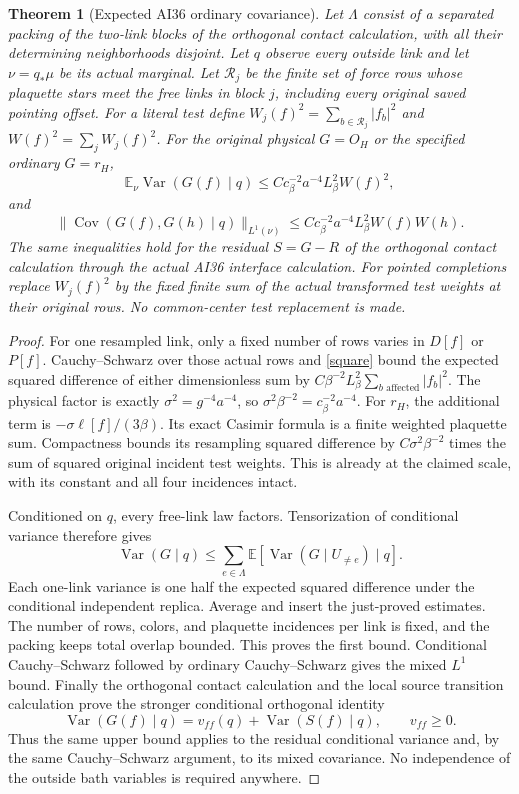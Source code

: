\documentclass[11pt]{article}
\newtheorem{theorem}{Theorem}
\newcommand{\E}{\mathbb E}
\newcommand{\Cov}{\operatorname{Cov}}
\newcommand{\Var}{\operatorname{Var}}
\begin{document}
\begin{theorem}[Expected AI36 ordinary covariance]
Let $\Lambda$ consist of a separated packing of the two-link blocks of the orthogonal contact calculation, with
all their determining neighborhoods disjoint. Let $q$ observe every outside link and let
$\nu=q_*\mu$ be its actual marginal. Let $\mathcal R_j$ be the finite set of force rows
whose plaquette stars meet the free links in block $j$, including every original saved
pointing offset. For a literal test define
$W_j(f)^2=\sum_{b\in\mathcal R_j}|f_b|^2$ and $W(f)^2=\sum_jW_j(f)^2$.
For the original physical $G=O_H$ or the specified ordinary $G=r_H$,
\[
 \E_\nu\Var(G(f)\mid q)\le Cc_\beta^{-2}a^{-4}L_\beta^2 W(f)^2,
\]
and
\[
 \|\Cov(G(f),G(h)\mid q)\|_{L^1(\nu)}
 \le Cc_\beta^{-2}a^{-4}L_\beta^2 W(f)W(h).
\]
The same inequalities hold for the residual $S=G-R$ of the orthogonal contact calculation through the actual AI36 interface calculation.
For pointed completions replace $W_j(f)^2$ by the fixed finite sum of the actual
transformed test weights at their original rows. No common-center test replacement is made.
\end{theorem}
\begin{proof}
For one resampled link, only a fixed number of rows varies in $D[f]$ or $P[f]$.
Cauchy--Schwarz over those actual rows and \eqref{square} bound the expected squared
difference of either dimensionless sum by
$C\beta^{-2}L_\beta^2\sum_{b\text{ affected}}|f_b|^2$.
The physical factor is exactly $\sigma^2=g^{-4}a^{-4}$, so
$\sigma^2\beta^{-2}=c_\beta^{-2}a^{-4}$.
For $r_H$, the additional term is $-\sigma\ell[f]/(3\beta)$.
Its exact Casimir formula is a finite weighted plaquette sum. Compactness bounds its
resampling squared difference by $C\sigma^2\beta^{-2}$ times the sum of squared
original incident test weights. This is already at the claimed scale, with its constant
and all four incidences intact.

Conditioned on $q$, every free-link law factors. Tensorization of conditional variance
therefore gives
\[
 \Var(G\mid q)\le\sum_{e\in\Lambda}\E[\Var(G\mid U_{\ne e})\mid q].
\]
Each one-link variance is one half the expected squared difference under the conditional
independent replica. Average and insert the just-proved estimates. The number of rows,
colors, and plaquette incidences per link is fixed, and the packing keeps total overlap
bounded. This proves the first bound. Conditional Cauchy--Schwarz followed by ordinary
Cauchy--Schwarz gives the mixed $L^1$ bound.
Finally the orthogonal contact calculation and the local source transition calculation prove the stronger conditional orthogonal identity
\[
 \Var(G(f)\mid q)=v_{ff}(q)+\Var(S(f)\mid q),\qquad v_{ff}\ge0.
\]
Thus the same upper bound applies to the residual conditional variance and, by the same
Cauchy--Schwarz argument, to its mixed covariance. No independence of the outside bath
variables is required anywhere.
\end{proof}
\end{document}
